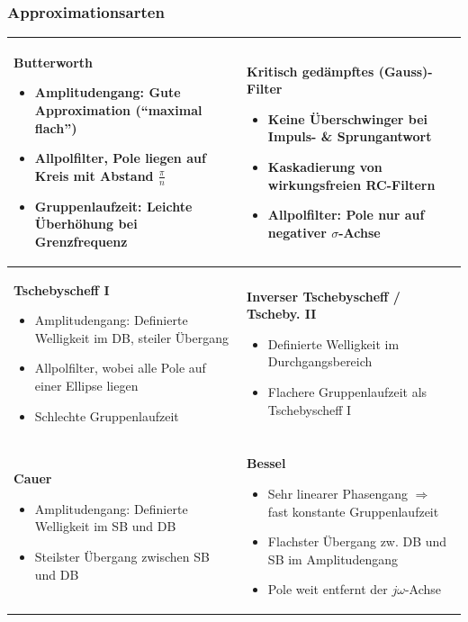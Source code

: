 \subsubsection{Approximationsarten }
\begin{tabular}{|p{9cm}|p{9cm}|}
\hline
\parbox{9cm}{
	\textbf{Butterworth} 
	\begin{itemize}
	 \item Amplitudengang: Gute Approximation (``maximal flach'')
	 \item Allpolfilter, Pole liegen auf Kreis mit Abstand
	 $\frac{\pi}{n}$
	 \item Gruppenlaufzeit: Leichte Überhöhung bei
	 Grenzfrequenz
	\end{itemize}
	}
& 
\parbox{9cm}{
	\textbf{Kritisch gedämpftes (Gauss)-Filter} 
	\begin{itemize}
	 \item Keine Überschwinger bei Impuls- \& Sprungantwort
	 \item Kaskadierung von wirkungsfreien RC-Filtern
	 \item Allpolfilter: Pole nur auf negativer $\sigma$-Achse
	\end{itemize}
	} \\
\hline
\parbox{9cm}{
	\textbf{Tschebyscheff I} 
	\begin{itemize}
	 \item Amplitudengang: Definierte Welligkeit im DB, steiler Übergang
	 \item Allpolfilter, wobei alle Pole auf einer Ellipse liegen
	 \item Schlechte Gruppenlaufzeit
	\end{itemize}
	}
&
 \parbox{9cm}{
	\textbf{Inverser Tschebyscheff  / Tscheby. II} 
	\begin{itemize}
	 \item Definierte Welligkeit im Durchgangsbereich
	 \item Flachere Gruppenlaufzeit als Tschebyscheff I
	\end{itemize}
	} \\
\hline
\parbox{6cm}{
	\textbf{Cauer} 
	\begin{itemize}
	 \item Amplitudengang: Definierte Welligkeit im SB und DB
	 \item Steilster Übergang zwischen SB und DB
	\end{itemize}
	}
& 
\parbox{6cm}{
	\textbf{Bessel} 
	\begin{itemize}
	 \item Sehr linearer Phasengang $\Rightarrow$ fast konstante Gruppenlaufzeit
	 \item Flachster Übergang zw. DB und SB im Amplitudengang
	 \item Pole weit entfernt der $j \omega$-Achse
	\end{itemize}
	} \\
\hline
\end{tabular}

